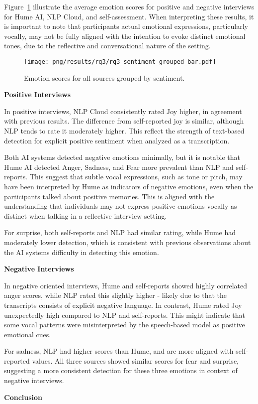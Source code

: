Figure~\ref{fig:sentiment-bar-rq3} illustrate the average emotion scores for positive and negative interviews for Hume AI, NLP Cloud, and self-assessment. 
When interpreting these results, it is important to note that participants actual emotional expressions, particularly vocally, may not be fully aligned with the intention to evoke distinct emotional tones, due to the reflective and conversational nature of the setting.
\begin{figure}[!h]
    \centering 
    \texttt{[image: png/results/rq3/rq3\_sentiment\_grouped\_bar.pdf]}
    \caption{Emotion scores for all sources grouped by sentiment.}
    \label{fig:sentiment-bar-rq3}
\end{figure}


\textbf{Positive Interviews}

In positive interviews, NLP Cloud consistently rated Joy higher, in agreement with previous results. The difference from self-reported joy is similar, although NLP tends to rate it moderately higher. 
This reflect the strength of text-based detection for explicit positive sentiment when analyzed as a transcription. 

Both AI systems detected negative emotions minimally, but it is notable that Hume AI detected Anger, Sadness, and Fear more prevalent than NLP and self-reports. 
This suggest that subtle vocal expressions, such as tone or pitch, may have been interpreted by Hume as indicators of negative emotions, even when the participants talked about positive memories. 
This is aligned with the understanding that individuals may not express positive emotions vocally as distinct when talking in a reflective interview setting. 

For surprise, both self-reports and NLP had similar rating, while Hume had moderately lower detection, which is consistent with previous observations about the AI systems difficulty in detecting this emotion. 

\medskip
\textbf{Negative Interviews}

In negative oriented interviews, Hume and self-reports showed highly correlated anger scores, while NLP rated this slightly higher - likely due to that the transcripts consists of explicit negative language. 
In contrast, Hume rated Joy unexpectedly high compared to NLP and self-reports. This might indicate that some vocal patterns were misinterpreted by the speech-based model as positive emotional cues. 

For sadness, NLP had higher scores than Hume, and are more aligned with self-reported values. All three sources showed similar scores for fear and surprise, suggesting a more consistent detection for these three emotions in context of negative interviews.

\medskip
\textbf{Conclusion}

